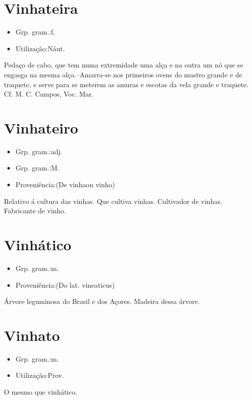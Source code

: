 \documentclass{article}
\begin{document}
\section{Vinhateira}
\begin{itemize}
\item {Grp. gram.:f.}
\end{itemize}
\begin{itemize}
\item {Utilização:Náut.}
\end{itemize}
Pedaço de cabo, que tem numa extremidade uma alça e na outra um nó que se engasga na mesma alça.--Amarra-se nos primeiros ovens do mastro grande e de traquete, e serve para se meterem as amuras e escotas da vela grande e traquete. Cf. M. C. Campos, \textunderscore Voc. Mar.\textunderscore 
\section{Vinhateiro}
\begin{itemize}
\item {Grp. gram.:adj.}
\end{itemize}
\begin{itemize}
\item {Grp. gram.:M.}
\end{itemize}
\begin{itemize}
\item {Proveniência:(De \textunderscore vinha\textunderscore  ou \textunderscore vinho\textunderscore )}
\end{itemize}
Relativo á cultura das vinhas.
Que cultiva vinhas.
Cultivador de vinhas.
Fabricante de vinho.
\section{Vinhático}
\begin{itemize}
\item {Grp. gram.:m.}
\end{itemize}
\begin{itemize}
\item {Proveniência:(Do lat. \textunderscore vineaticus\textunderscore )}
\end{itemize}
Árvore leguminosa do Brasil e dos Açores.
Madeira dessa árvore.
\section{Vinhato}
\begin{itemize}
\item {Grp. gram.:m.}
\end{itemize}
\begin{itemize}
\item {Utilização:Prov.}
\end{itemize}
O mesmo que \textunderscore vinhático\textunderscore .
\end{document}
